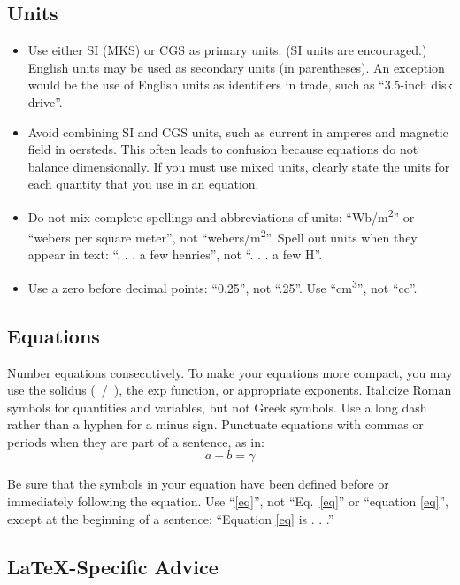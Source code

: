 \documentclass[10pt, conference]{IEEEtran}
\begin{document}
\subsection{Units}
\begin{itemize}
\item Use either SI (MKS) or CGS as primary units. (SI units are encouraged.) English units may be used as secondary units (in parentheses). An exception would be the use of English units as identifiers in trade, such as ``3.5-inch disk drive''.
\item Avoid combining SI and CGS units, such as current in amperes and magnetic field in oersteds. This often leads to confusion because equations do not balance dimensionally. If you must use mixed units, clearly state the units for each quantity that you use in an equation.
\item Do not mix complete spellings and abbreviations of units: ``Wb/m\textsuperscript{2}'' or ``webers per square meter'', not ``webers/m\textsuperscript{2}''. Spell out units when they appear in text: ``. . . a few henries'', not ``. . . a few H''.
\item Use a zero before decimal points: ``0.25'', not ``.25''. Use ``cm\textsuperscript{3}'', not ``cc''.
\end{itemize}

\subsection{Equations}
Number equations consecutively. To make your 
equations more compact, you may use the solidus (~/~), the exp function, or 
appropriate exponents. Italicize Roman symbols for quantities and variables, 
but not Greek symbols. Use a long dash rather than a hyphen for a minus 
sign. Punctuate equations with commas or periods when they are part of a 
sentence, as in:
\begin{equation}
a+b=\gamma\label{eq}
\end{equation}

Be sure that the 
symbols in your equation have been defined before or immediately following 
the equation. Use ``\eqref{eq}'', not ``Eq.~\eqref{eq}'' or ``equation \eqref{eq}'', except at 
the beginning of a sentence: ``Equation \eqref{eq} is . . .''

\subsection{\LaTeX-Specific Advice}
\end{document}
